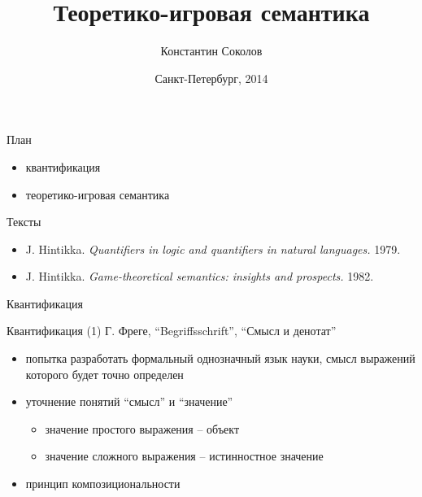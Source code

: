 \documentclass{beamer}
\begin{document}
\title{\Large{Теоретико-игровая семантика}}
\author{Константин Соколов}
\date{Санкт-Петербург, 2014} 
\begin{frame}
    \thispagestyle{empty}
    \titlepage
\end{frame}

\begin{frame}{План}
\setcounter{framenumber}{1}
    \begin{itemize}
		\item квантификация 
		\item теоретико-игровая семантика
    \end{itemize}
\end{frame}

\begin{frame}{Тексты}
\begin{itemize}
	\item J. Hintikka. \textit{Quantifiers in logic and quantifiers in natural languages.} 1979.
    \item J. Hintikka. \textit{Game-theoretical semantics: insights and prospects.} 1982.
\end{itemize}
\end{frame}

\begin{frame}{}
\begin{center}
Квантификация
\end{center}
\end{frame}

\begin{frame}{Квантификация (1)}
Г. Фреге, ``Begriffsschrift'', ``Смысл и денотат''\\
\bigskip
\begin{itemize}
	\item попытка разработать формальный однозначный язык науки, смысл выражений которого будет точно определен
	\item уточнение понятий ``смысл'' и ``значение''
	    \begin{itemize}
	        \item значение простого выражения -- объект 
	        \item значение сложного выражения -- истинностное значение
	    \end{itemize}
	\item принцип композициональности
\end{itemize}
\end{frame}
\end{document}

